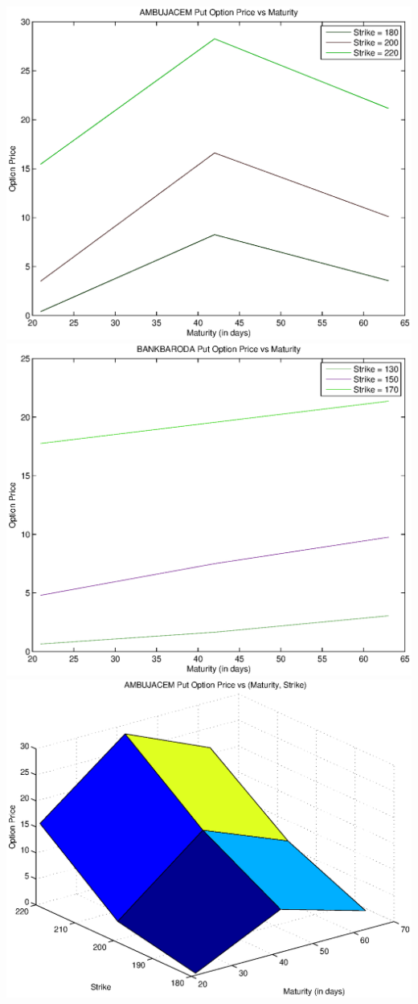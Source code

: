 \documentclass{article}
\begin{document}
\includegraphics[width=\textwidth]{AMBUJACEM_Put_Option_Price_vs_Maturity} \\              
\includegraphics[width=\textwidth]{BANKBARODA_Put_Option_Price_vs_Maturity} \\
\includegraphics[width=\textwidth]{AMBUJACEM_Put_Option_Price_vs_(Maturity,_Strike)} \\    
\end{document}
